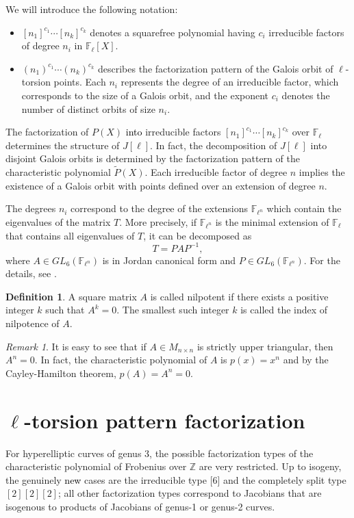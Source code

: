 \documentclass[11pt,a4paper]{article}
\theoremstyle{plain}
\theoremstyle{definition}
\newtheorem{defi}[theorem]{Definition}
\theoremstyle{remark}
\newtheorem{remark}[theorem]{Remark}
\newcommand{\verde}[1]{\textcolor{black}{#1}}
\newcommand{\azul}[1]{\textcolor{black}{#1}}
\begin{document}
We will introduce the following notation:
\begin{itemize}
    \item $[n_1]^{c_1}\cdots[n_k]^{c_k}$ denotes a squarefree polynomial having $c_i$ irreducible factors of degree $n_i$ in $\mathbb{F}_{\ell}[X]$.
    \item $(n_1)^{c_1}\cdots(n_k)^{c_k}$ describes the factorization pattern of the Galois orbit of $\ell$-torsion points. Each $n_i$ represents the degree of an irreducible factor, which corresponds to the size of a Galois orbit, and the exponent $c_i$ denotes the number of distinct orbits of size $n_i$.
    
\end{itemize}

The factorization of $P(X)$ \verde{into} irreducible factors $[n_1]^{c_1}\cdots[n_k]^{c_k}$ over $\mathbb{F}_{\ell}$ determines the structure of $J[\ell]$. In fact, the decomposition of $J[\ell]$ into disjoint Galois orbits is determined by the factorization pattern of the characteristic polynomial $\widetilde{P}(X)$. Each irreducible factor of degree $n$ implies the existence of a Galois orbit with points defined over an extension of degree $n$. 

The degrees $n_i$ correspond to the degree of the extensions $\mathbb{F}_{\ell^n}$ which contain the eigenvalues of the matrix $T$. More precisely, if  $\mathbb{F}_{\ell^n}$ is the minimal extension of $\mathbb{F}_{\ell}$ that contains all eigenvalues of $T$, it can be decomposed as
\[
T = P A P^{-1},
\]
where $A \in GL_6(\mathbb{F}_{\ell^n})$ is in Jordan canonical form and 
$P \in GL_6(\mathbb{F}_{\ell^n})$. For the details, see \cite[Theorem 8.6]{roman2008}. 



\begin{defi}
A square matrix $A$ is called nilpotent if there exists a positive integer $k$ such that $A^k = 0$. The smallest such integer $k$ is called the index of nilpotence of $A$.
\end{defi}

\begin{remark}
 It is easy to see that if $A\in M_{n\times n}$  is strictly upper triangular, then $A^n = 0$. In fact, the characteristic polynomial of $A$ is $p(x)=x^n$ and by the Cayley-Hamilton theorem, $p(A)=A^n=0.$  
\end{remark}





\section{$\ell$-torsion pattern factorization}
For hyperelliptic curves of genus 3, the possible factorization types of the characteristic polynomial of Frobenius over $\mathbb{Z}$ are very restricted. Up to isogeny, the genuinely \azul{new} cases are the irreducible type  [6] and the completely split type  $[2][2][2]$;
all other factorization types correspond to Jacobians that are isogenous to products of Jacobians of genus-1 or genus-2 curves. 
\end{document}
